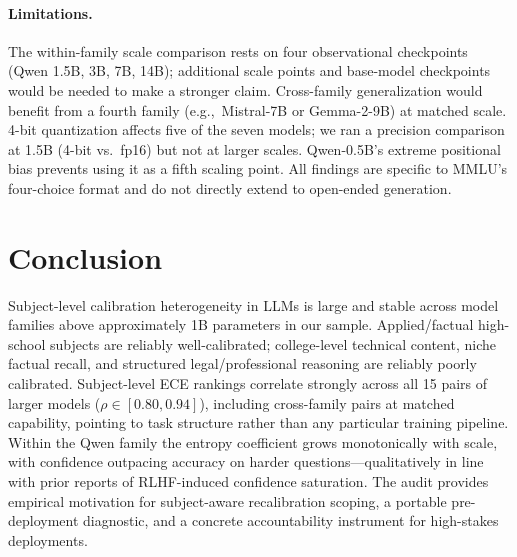 \documentclass{article}
\begin{document}
\paragraph{Limitations.}
The within-family scale comparison rests on four observational checkpoints
(Qwen 1.5B, 3B, 7B, 14B); additional scale points and base-model checkpoints
would be needed to make a stronger claim. Cross-family generalization would
benefit from a fourth family (e.g.,\ Mistral-7B or Gemma-2-9B) at matched
scale. 4-bit quantization affects five of the seven models; we ran a
precision comparison at 1.5B (4-bit vs.\ fp16) but not at larger scales.
Qwen-0.5B's extreme positional bias prevents using it as a fifth scaling
point. All findings are specific to MMLU's four-choice format and do not
directly extend to open-ended generation.

\section{Conclusion}

Subject-level calibration heterogeneity in LLMs is large and stable across
model families above approximately 1B parameters in our sample.
Applied/factual high-school subjects are reliably well-calibrated;
college-level technical content, niche factual recall, and structured
legal/professional reasoning are reliably poorly calibrated. Subject-level ECE
rankings correlate strongly across all 15 pairs of larger models ($\rho \in
[0.80, 0.94]$), including cross-family pairs at matched capability, pointing
to task structure rather than any particular training pipeline. Within the
Qwen family the entropy coefficient grows monotonically with scale, with
confidence outpacing accuracy on harder questions---qualitatively in line
with prior reports of RLHF-induced confidence saturation. The audit
provides empirical motivation for subject-aware recalibration scoping, a
portable pre-deployment diagnostic, and a concrete accountability instrument
for high-stakes deployments.



\end{document}
